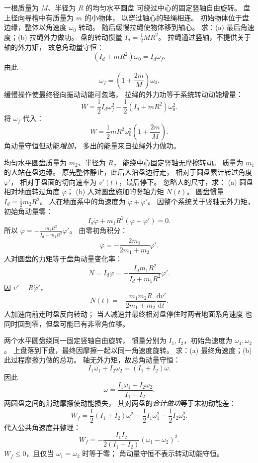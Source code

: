 一根质量为 $M$、半径为 $R$ 的均匀水平圆盘
可绕过中心的固定竖轴自由旋转。
盘上径向导槽中有质量为 $m$ 的小物体，
以穿过轴心的轻绳相连。
初始物体位于盘边缘，整体以角速度 $\omega_0$ 转动。
随后缓慢拉绳使物体移到轴心。
求：(a) 最后角速度；(b) 拉绳外力做功。
\exsolution
盘的转动惯量
$I_d=\frac12MR^2$。
拉绳通过竖轴，不提供关于轴的外力矩，
故总角动量守恒：
\[
(I_d+mR^2)\omega_0=I_d\omega_f.
\]
由此
\[
\boxed{\omega_f=\left(1+\frac{2m}{M}\right)\omega_0}.
\]
缓慢操作使最终径向振动动能可忽略，
拉绳的外力功等于系统转动动能增量：
\[
W=\frac12I_d\omega_f^2
-\frac12(I_d+mR^2)\omega_0^2.
\]
将 $\omega_f$ 代入：
\[
\boxed{W=\frac12mR^2\omega_0^2
\left(1+\frac{2m}{M}\right)}.
\]
\excheck 角动量守恒但动能\emph{增加}，
多出的能量来自拉绳外力做功。

均匀水平圆盘质量为 $m_2$、半径为 $R$，
能绕中心固定竖轴无摩擦转动。
质量为 $m_1$ 的人站在盘边缘。
原先整体静止，此后人沿盘边行走，
相对于圆盘累计转过角度 $\varphi'$，
相对于盘面的切向速率为 $v'(t)$，最后停下。
忽略人的尺寸，求：
(a) 圆盘相对地面转过角度 $\varphi$；
(b) 人对圆盘施加的竖轴力矩 $N(t)$。
\exsolution
圆盘惯量
$I_d=\frac12m_2R^2$。
人在地面系中的角速度为
$\dot\varphi+\dot\varphi'$。
因整个系统关于竖轴无外力矩，初始角动量零：
\[
I_d\dot\varphi+
m_1R^2(\dot\varphi+\dot\varphi')=0.
\]
所以
$\dot\varphi=
-\frac{m_1R^2}{I_d+m_1R^2}\dot\varphi'$。
由零初角积分：
\[
\boxed{\varphi=-\frac{2m_1}{2m_1+m_2}\varphi'}.
\]
人对圆盘的力矩等于盘角动量变化率：
\[
N=I_d\ddot\varphi
=-\frac{I_d m_1R^2}{I_d+m_1R^2}\ddot\varphi'.
\]
因 $v'=R\dot\varphi'$，
\[
\boxed{N(t)=-\frac{m_1m_2R}{2m_1+m_2}
\frac{\mathrm dv'}{\mathrm dt}}.
\]
\excheck 人加速向前走时盘反向转动；
当人减速并最终相对盘停住时两者地面系角速度
也同时回到零，但盘可能已有非零角位移。

两个水平圆盘绕同一固定竖轴自由旋转，
惯量分别为 $I_1,I_2$，初始角速度为
$\omega_1,\omega_2$。
上盘落到下盘，最终因摩擦一起以同一角速度旋转。
求：(a) 最终角速度；(b) 此过程摩擦力做的总功。
\exsolution
轴无外力矩，故总角动量守恒：
\[
I_1\omega_1+I_2\omega_2=(I_1+I_2)\omega.
\]
因此
\[
\boxed{\omega=\frac{I_1\omega_1+I_2\omega_2}{I_1+I_2}}.
\]
两圆盘之间的滑动摩擦使动能损失，
其对两盘的\emph{合计做功}等于末初动能差：
\[
W_f=\frac12(I_1+I_2)\omega^2
-\frac12I_1\omega_1^2-\frac12I_2\omega_2^2.
\]
代入公共角速度并整理：
\[
\boxed{W_f=-\frac{I_1I_2}{2(I_1+I_2)}
(\omega_1-\omega_2)^2}.
\]
\excheck $W_f\le0$，且仅当
$\omega_1=\omega_2$ 时等于零；
角动量守恒不表示转动动能守恒。

